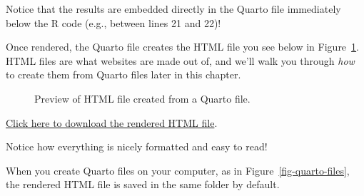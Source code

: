 \documentclass[
  letterpaper,
  DIV=11,
  numbers=noendperiod]{scrreprt}
\begin{document}
Notice that the results are embedded directly in the Quarto file
immediately below the R code (e.g., between lines 21 and 22)!

Once rendered, the Quarto file creates the HTML file you see below in
Figure~\ref{fig-rendered-preview}. HTML files are what websites are made
out of, and we'll walk you through \emph{how} to create them from Quarto
files later in this chapter.

\begin{figure}


\caption{\label{fig-rendered-preview}Preview of HTML file created from a
Quarto file.}

\end{figure}%

\href{https://www.dropbox.com/scl/fi/ya5b4m6bgr8d8de4ru1sf/example_quarto.html?rlkey=w33jjogy6x1h3m6n5khffzlrh&dl=1}{Click
here to download the rendered HTML file}.

Notice how everything is nicely formatted and easy to read!

When you create Quarto files on your computer, as in
Figure~\ref{fig-quarto-files}, the rendered HTML file is saved in the
same folder by default.
\end{document}
